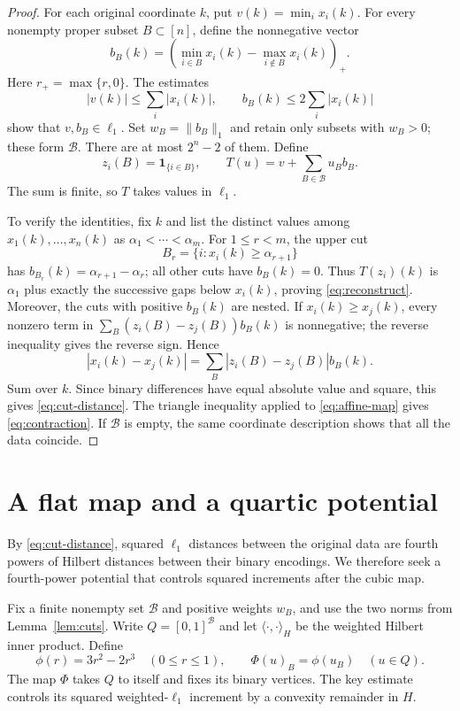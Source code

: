 \documentclass[11pt]{article}
\theoremstyle{definition}
\theoremstyle{remark}
\numberwithin{equation}{section}
\newcommand{\ind}{\mathbf 1}
\begin{document}
\begin{proof}
For each original coordinate $k$, put $v(k)=\min_i x_i(k)$.
For every nonempty proper subset $B\subset[n]$, define the
nonnegative vector
\begin{equation}\label{eq:cut-vector}
 b_B(k)=\left(\min_{i\in B}x_i(k)
                   -\max_{i\notin B}x_i(k)\right)_+.
\end{equation}
Here $r_+=\max\{r,0\}$. The estimates
\[
 |v(k)|\leq\sum_i|x_i(k)|,
 \qquad b_B(k)\leq2\sum_i|x_i(k)|
\]
show that $v,b_B\in\ell_1$. Set $w_B=\|b_B\|_1$ and
retain only subsets with $w_B>0$; these form $\mathcal B$.
There are at most $2^n-2$ of them. Define
\begin{equation}\label{eq:affine-map}
 z_i(B)=\ind_{\{i\in B\}},\qquad
 T(u)=v+\sum_{B\in\mathcal B}u_B b_B.
\end{equation}
The sum is finite, so $T$ takes values in $\ell_1$.

To verify the identities, fix $k$ and list the distinct values
among $x_1(k),\ldots,x_n(k)$ as
$\alpha_1<\cdots<\alpha_m$. For $1\leq r<m$, the upper cut
\[
 B_r=\{i:x_i(k)\geq\alpha_{r+1}\}
\]
has $b_{B_r}(k)=\alpha_{r+1}-\alpha_r$; all other cuts have
$b_B(k)=0$. Thus $T(z_i)(k)$ is $\alpha_1$ plus exactly the
successive gaps below $x_i(k)$, proving \eqref{eq:reconstruct}.
Moreover, the cuts with positive $b_B(k)$ are nested. If
$x_i(k)\geq x_j(k)$, every nonzero term in
$\sum_B(z_i(B)-z_j(B))b_B(k)$ is nonnegative; the reverse
inequality gives the reverse sign. Hence
\[
 |x_i(k)-x_j(k)|
 =\sum_B |z_i(B)-z_j(B)|b_B(k).
\]
Sum over $k$. Since binary differences have equal absolute value
and square, this gives \eqref{eq:cut-distance}. The triangle
inequality applied to \eqref{eq:affine-map} gives
\eqref{eq:contraction}. If $\mathcal B$ is empty, the same
coordinate description shows that all the data coincide.
\end{proof}

\section{A flat map and a quartic potential}
\label{sec:flat}

By \eqref{eq:cut-distance}, squared $\ell_1$ distances between
the original data are fourth powers of Hilbert distances between
their binary encodings. We therefore seek a fourth-power
potential that controls squared increments after the cubic map.

Fix a finite nonempty set $\mathcal B$ and positive weights $w_B$,
and use the two norms from Lemma~\ref{lem:cuts}. Write
$Q=[0,1]^{\mathcal B}$ and let $\langle\cdot,\cdot\rangle_H$
be the weighted Hilbert inner product. Define
\[
 \phi(r)=3r^2-2r^3\quad(0\leq r\leq1),
 \qquad \Phi(u)_B=\phi(u_B)\quad(u\in Q).
\]
The map $\Phi$ takes $Q$ to itself and fixes its binary vertices.
The key estimate controls its squared weighted-$\ell_1$ increment
by a convexity remainder in $H$.
\end{document}
